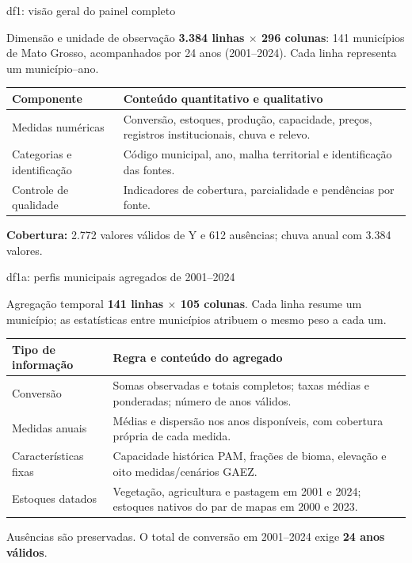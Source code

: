 \documentclass[aspectratio=169,11pt]{beamer}
\begin{document}
\begin{frame}{df1: visão geral do painel completo}
\begin{block}{Dimensão e unidade de observação}
\textbf{3.384 linhas $\times$ 296 colunas}: 141 municípios de Mato Grosso, acompanhados por 24 anos (2001--2024). Cada linha representa um município--ano.
\end{block}
\small
\begin{tabularx}{\textwidth}{P{3.15cm} L}
\toprule
\textbf{Componente} & \textbf{Conteúdo quantitativo e qualitativo}\\
\midrule
Medidas numéricas & Conversão, estoques, produção, capacidade, preços, registros institucionais, chuva e relevo.\\
Categorias e identificação & Código municipal, ano, malha territorial e identificação das fontes.\\
Controle de qualidade & Indicadores de cobertura, parcialidade e pendências por fonte.\\
\bottomrule
\end{tabularx}\par
\smallskip
\textbf{Cobertura:} 2.772 valores válidos de Y e 612 ausências; chuva anual com 3.384 valores.
\end{frame}

\begin{frame}{df1a: perfis municipais agregados de 2001--2024}
\begin{block}{Agregação temporal}
\textbf{141 linhas $\times$ 105 colunas}. Cada linha resume um município; as estatísticas entre municípios atribuem o mesmo peso a cada um.
\end{block}
\small
\begin{tabularx}{\textwidth}{P{3.25cm} L}
\toprule
\textbf{Tipo de informação} & \textbf{Regra e conteúdo do agregado}\\
\midrule
Conversão & Somas observadas e totais completos; taxas médias e ponderadas; número de anos válidos.\\
Medidas anuais & Médias e dispersão nos anos disponíveis, com cobertura própria de cada medida.\\
Características fixas & Capacidade histórica PAM, frações de bioma, elevação e oito medidas/cenários GAEZ.\\
Estoques datados & Vegetação, agricultura e pastagem em 2001 e 2024; estoques nativos do par de mapas em 2000 e 2023.\\
\bottomrule
\end{tabularx}\par
\smallskip
Ausências são preservadas. O total de conversão em 2001--2024 exige \textbf{24 anos válidos}.
\end{frame}
\end{document}
